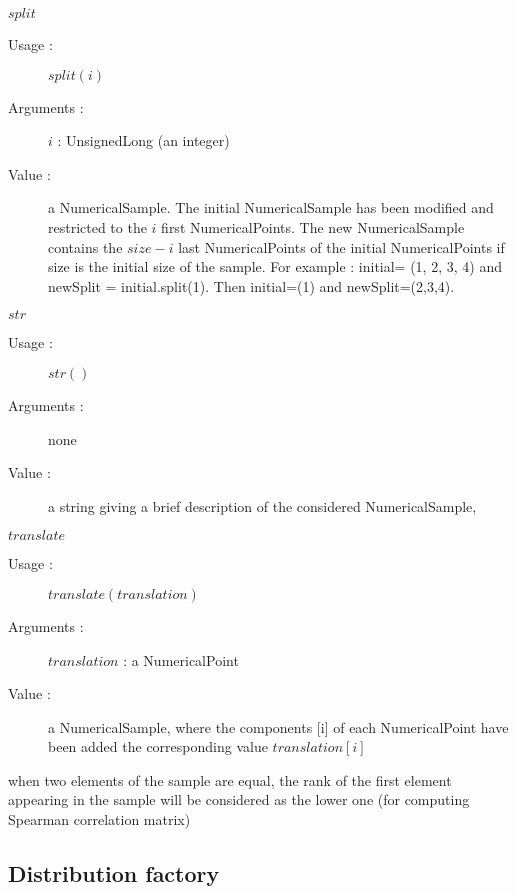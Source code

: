\begin{description}
\begin{description}
  \item $split$
    \begin{description}
    \item[Usage :] $split(i)$
    \item[Arguments :] $i$ : UnsignedLong (an integer)
    \item[Value :] a NumericalSample. The initial NumericalSample has been modified and restricted to the $i$ first NumericalPoints. The new NumericalSample contains the $size - i$ last NumericalPoints of the initial NumericalPoints if size is the initial size of the sample.
      For example : initial= (1, 2, 3, 4) and newSplit = initial.split(1). Then initial=(1) and newSplit=(2,3,4).
    \end{description}
    \bigskip


  \item $str$
    \begin{description}
    \item[Usage :] $str()$
    \item[Arguments :] none
    \item[Value :] a string giving a brief description of the considered NumericalSample,
    \end{description}
    \bigskip


  \item $translate$
    \begin{description}
    \item[Usage :] $translate(translation)$
    \item[Arguments :] $translation$ : a NumericalPoint
    \item[Value :] a NumericalSample, where the components [i] of each NumericalPoint have been added the corresponding value $translation[i]$
    \end{description}

  \end{description}

\item[Details :] \rule{0pt}{1em}
  \begin{description}
  \item when two elements of the sample are equal, the rank of the first element appearing in the sample
    will be considered as the lower one (for computing Spearman correlation matrix)
  \end{description}

\end{description}


\newpage \subsection{Distribution factory}
